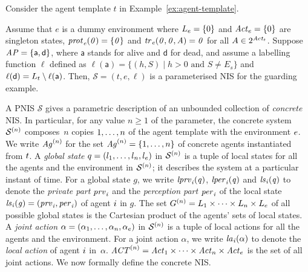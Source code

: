 \begin{example}
  \label{ex:pnis}
  Consider the agent template $t$ in Example~\ref{ex:agent-template}.

  Assume that $e$ is a dummy environment where $L_{e}= \{0\}$ and
  $\mathit{Act}_{e}=\{0\}$ are singleton states, $\it{prot}_{e}(0) = \{0\}$ and
  $\it{tr}_{e}(0,0,A) = 0$ for all $A\in 2^{\mathit{Act}_{t}}$.
  Suppose $\it{AP} = \{\mathsf{a}, \mathsf{d}\}$, where $\mathsf{a}$ stands for
  alive and $\mathsf{d}$ for dead, and assume a labelling function $\ell$
  defined as $\ell(\mathsf{a}) = \{(h,S) \mid h > 0 \text{ and }S \neq E_s\}$
  and $\ell(\mathsf{d}) = L_{t} \setminus \ell(\mathsf{a})$.
%
  Then, $\mathcal{S} = (t,e,\ell)$ is a parameterised NIS for the guarding example.
\end{example}

A PNIS $\mathcal S$ gives a parametric description of an unbounded collection
of {\em concrete} NIS. In particular, for any value $n \geq 1$ of the parameter, 
the concrete system $\mathcal{S}^{(n)}$ composes~$n$ copies ${1}, \ldots, {n}$ of the
agent template with the environment ${e}$. We write $\mathit{Ag}^{(n)}$ for the set
$\mathit{Ag}^{(n)} = \left \{ {1}, \ldots, {n} \right \}$ of concrete agents instantiated from
${t}$.
%
A \emph{global state} $q = \left ( l_{1}, \ldots, l_{n}, l_{e} \right )$ in
$\mathcal{S}^{(n)}$ is a tuple of local states for all the agents and the environment in
$\mathcal{S}^{(n)}$; it describes the system at a particular instant of time.  For a
global state $g$, we write $\it{lprv}_{i}(q)$, $\it{lper}_{i}(q)$ and $\it{ls}_{i}(q)$ to
denote the \emph{private part} $\it{prv}_{i}$ and the \emph{perception part} $\it{per}_{i}$
of the local state $\it{ls}_{i}(g) = \left ( \it{prv}_{i}, \it{per}_{i} \right )$ of agent ${i}$ in
$g$.  The set $G^{(n)}=L_{1}\times\dots\times L_{n}\times L_e$
of all possible global states is the Cartesian product of the agents' sets of
local states.
% 
A \emph{joint action} $\alpha = \left ( \alpha_1, \ldots, \alpha_n, \alpha_e \right )$
in $\mathcal{S}^{(n)}$ is a tuple of local actions for all the agents and the environment.
For a joint action $\alpha$, we write $\it{la}_{i}({\alpha})$ to denote the
\emph{local action} of agent ${i}$ in~$\alpha$.  
$\mathit{ACT}^{(n)} = \mathit{Act}_{1}\times\dots\times\mathit{Act}_{n}\times\mathit{Act}_{e}$ is the set of all
joint actions.
We now formally define the concrete NIS.




